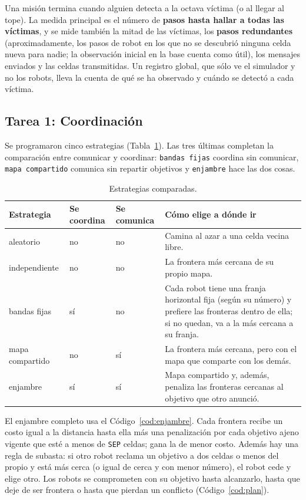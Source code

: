 \documentclass[11pt,letterpaper]{article}
\begin{document}
Una misión termina cuando alguien detecta a la octava víctima (o al llegar al tope). La medida principal es el número de \textbf{pasos hasta hallar a todas las víctimas}, y se mide también la mitad de las víctimas, los \textbf{pasos redundantes} (aproximadamente, los pasos de robot en los que no se descubrió ninguna celda nueva para nadie; la observación inicial en la base cuenta como útil), los mensajes enviados y las celdas transmitidas. Un registro global, que sólo ve el simulador y no los robots, lleva la cuenta de qué se ha observado y cuándo se detectó a cada víctima.

\subsection{Tarea 1: Coordinación}

Se programaron cinco estrategias (Tabla~\ref{tab:estrategias}). Las tres últimas completan la comparación entre comunicar y coordinar: \texttt{bandas fijas} coordina sin comunicar, \texttt{mapa compartido} comunica sin repartir objetivos y \texttt{enjambre} hace las dos cosas.

\begin{table}[H]
\centering
\caption{Estrategias comparadas.}
\label{tab:estrategias}
\small
\begin{tabular}{@{}p{2.6cm}p{1.6cm}p{1.8cm}p{6.6cm}@{}}
\toprule
Estrategia & Se coordina & Se comunica & Cómo elige a dónde ir \\
\midrule
aleatorio & no & no & Camina al azar a una celda vecina libre. \\
independiente & no & no & La frontera más cercana de su propio mapa. \\
bandas fijas & sí & no & Cada robot tiene una franja horizontal fija (según su número) y prefiere las fronteras dentro de ella; si no quedan, va a la más cercana a su franja. \\
mapa compartido & no & sí & La frontera más cercana, pero con el mapa que comparte con los demás. \\
enjambre & sí & sí & Mapa compartido y, además, penaliza las fronteras cercanas al objetivo que otro anunció. \\
\bottomrule
\end{tabular}
\end{table}

El enjambre completo usa el Código~\ref{cod:enjambre}. Cada frontera recibe un costo igual a la distancia hasta ella más una penalización por cada objetivo ajeno vigente que esté a menos de \texttt{SEP} celdas; gana la de menor costo. Además hay una regla de subasta: si otro robot reclama un objetivo a dos celdas o menos del propio y está más cerca (o igual de cerca y con menor número), el robot cede y elige otro. Los robots se comprometen con su objetivo hasta alcanzarlo, hasta que deje de ser frontera o hasta que pierdan un conflicto (Código~\ref{cod:plan}).
\end{document}
